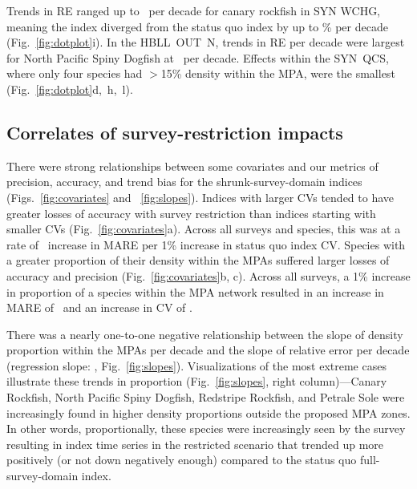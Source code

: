 \documentclass[12pt]{article}
\begin{document}
\begin{spacing}{1.4}
Trends in RE ranged up to \canaryrockfishSYNWCHGslopere\ per decade for canary rockfish in SYN WCHG, meaning the index diverged from the status quo index by up to \canaryrockfishSYNWCHGsloperePerc\% per decade (Fig.~\ref{fig:dotplot}i).
In the HBLL~OUT~N, trends in RE per decade were largest for North Pacific Spiny Dogfish at \northpacificspinydogfishSYNWCHGslopere\ per decade.
Effects within the SYN~QCS, where only four species had $>$15\% density within the MPA, were the smallest (Fig.~\ref{fig:dotplot}d,~h,~l).

\subsection*{Correlates of survey-restriction impacts}

There were strong relationships between some covariates and our metrics of precision, accuracy, and trend bias for the shrunk-survey-domain indices (Figs.~\ref{fig:covariates} and ~\ref{fig:slopes}).
Indices with larger CVs tended to have greater losses of accuracy with survey restriction than indices starting with smaller CVs (Fig.~\ref{fig:covariates}a).
Across all surveys and species, this was at a rate of \covCvmaregeostat\ increase in MARE per 1\% increase in status quo index CV.
Species with a greater proportion of their density within the MPAs suffered larger losses of accuracy and precision (Fig.~\ref{fig:covariates}b, c).
Across all surveys, a 1\% increase in proportion of a species within the MPA network resulted in an increase in MARE of \covMareGeo\ and an increase in CV of \covPrecisionGeo.

There was a nearly one-to-one negative relationship between the slope of density proportion within the MPAs per decade and the slope of relative error per decade (regression slope: \REslopeRegress, Fig.~\ref{fig:slopes}).
Visualizations of the most extreme cases illustrate these trends in proportion (Fig.~\ref{fig:slopes}, right column)---Canary Rockfish, North Pacific Spiny Dogfish, Redstripe Rockfish, and Petrale Sole were increasingly found in higher density proportions outside the proposed MPA zones.
In other words, proportionally, these species were increasingly seen by the survey resulting in index time series in the restricted scenario that trended up more positively (or not down negatively enough) compared to the status quo full-survey-domain index.


\end{spacing}
\end{document}
